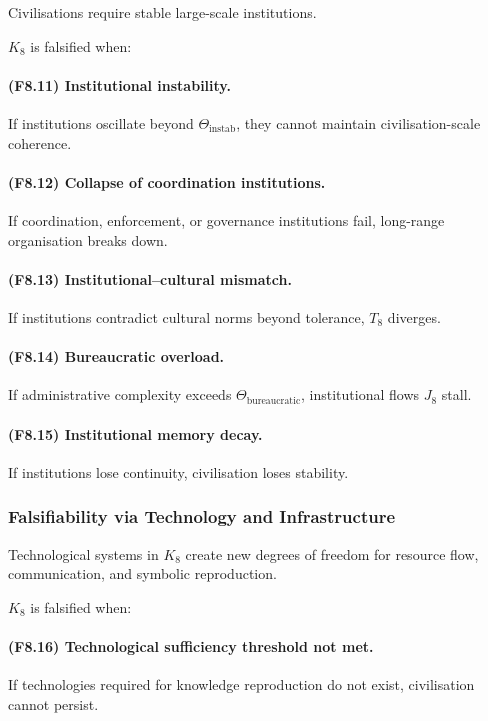 Civilisations require stable large-scale institutions.

$K_8$ is falsified when:

\paragraph{(F8.11) Institutional instability.}
If institutions oscillate beyond $\Theta_{\mathrm{instab}}$,
they cannot maintain civilisation-scale coherence.

\paragraph{(F8.12) Collapse of coordination institutions.}
If coordination, enforcement, or governance institutions fail,
long-range organisation breaks down.

\paragraph{(F8.13) Institutional–cultural mismatch.}
If institutions contradict cultural norms beyond tolerance,
$T_8$ diverges.

\paragraph{(F8.14) Bureaucratic overload.}
If administrative complexity exceeds $\Theta_{\mathrm{bureaucratic}}$,
institutional flows $J_8$ stall.

\paragraph{(F8.15) Institutional memory decay.}
If institutions lose continuity, civilisation loses stability.



\subsubsection{Falsifiability via Technology and Infrastructure}

Technological systems in $K_8$ create new degrees of freedom
for resource flow, communication, and symbolic reproduction.

$K_8$ is falsified when:

\paragraph{(F8.16) Technological sufficiency threshold not met.}
If technologies required for knowledge reproduction do not exist,
civilisation cannot persist.

